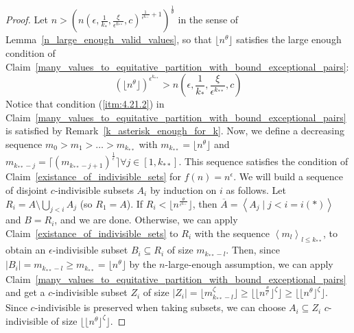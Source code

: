         \begin{proof}
            Let $n > \left( n\left( \epsilon, \frac{1}{k_*}, \frac{\xi}{\epsilon^{k_{**}}}, c \right)^{\frac{1}{\epsilon^{k_{**}}} + 1} \right)^{\frac{1}{\theta}}$
                in the sense of Lemma~\ref{n_large_enough_valid_values}, so that $\lfloor n^\theta \rfloor$ satisfies the
                large enough condition of Claim~\ref{many_values_to_equitative_partition_with_bound_exceptional_pairs}:
                \[
                    \left( \lfloor n^\theta \rfloor \right)^{\epsilon^{k_{**}}}
                        > n\left( \epsilon, \frac{1}{k_*}, \frac{\xi}{\epsilon^{k_{**}}}, c \right)
                \]
            Notice that condition (\ref{itm:4.21.2}) in Claim~\ref{many_values_to_equitative_partition_with_bound_exceptional_pairs}
                is satisfied by Remark~\ref{k_asterisk_enough_for_k}.
            Now, we define a decreasing sequence $m_0 > m_1 > \dots > m_{k_{**}}$ with $m_{k_{**}} = \lfloor n^\theta \rfloor$
                and $m_{k_{**}-j} = \lceil \left( m_{k_{**}-j+1} \right)^{\frac{1}{\epsilon}} \rceil \forall j \in [1, k_{**}]$.
            This sequence satisfies the condition of Claim~\ref{existance_of_indivisible_sets} for $f(n) = n^\epsilon$.
            We will build a sequence of disjoint $c$-indivisible subsets $A_i$ by induction on $i$ as follows.
            Let $R_i = A \setminus \bigcup_{j<i} A_j$ (so $R_1 = A$).
            If $R_i < \lfloor n^{\frac{\theta}{\epsilon^{k_{**}}}} \rfloor$, then
                $\overline{A} = \left< A_j \mid j < i = i(*) \right>$ and $B = R_i$, and we are done.
            Otherwise, we can apply Claim~\ref{existance_of_indivisible_sets} to $R_i$ with the sequence
                $\left< m_l \right>_{l \leq k_{**}}$, to obtain an $\epsilon$-indivisible subset $B_i \subseteq R_i$ of
                size $m_{k_{**}-l}$.
            Then, since $|B_i| = m_{k_{**}-l} \geq m_{k_{**}} = \lfloor n^\theta \rfloor$ by the $n$-large-enough assumption,
                we can apply Claim~\ref{many_values_to_equitative_partition_with_bound_exceptional_pairs} and get a
                $c$-indivisible subset $Z_i$ of size $|Z_i| = \lfloor m_{k_{**}-l}^\zeta \rfloor
                \geq \lfloor \lfloor n^{\frac{\theta}{\epsilon^l}} \rfloor ^\zeta \rfloor
                \geq \lfloor \lfloor n^{\theta} \rfloor ^\zeta \rfloor$.
            Since $c$-indivisible is preserved when taking subsets, %
                we can choose $A_i \subseteq Z_i$ $c$-indivisible of size $\lfloor \lfloor n^{\theta} \rfloor ^\zeta \rfloor$.
        \end{proof}

